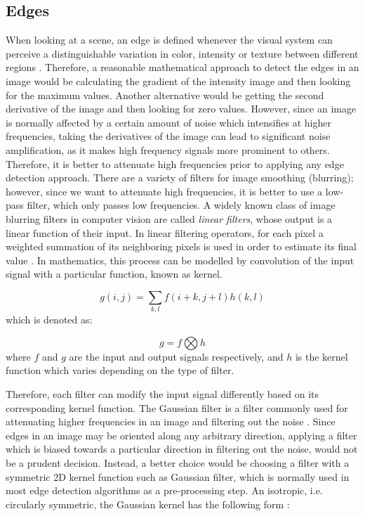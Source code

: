 \subsection{Edges}
When looking at a scene, an edge is defined whenever the visual system can perceive a distinguishable variation in color, intensity or texture between 
different regions \cite{sze11}.
Therefore, a reasonable mathematical approach to detect the edges in an image would be calculating the gradient of the intensity image and then looking for the maximum
values. Another alternative would be getting the second derivative of the image and then looking for zero values. However, since an image is normally affected by a 
certain amount of noise which intensifies at higher frequencies, taking the derivatives of the image can lead to significant noise amplification, 
as it makes high frequency signals more prominent to others.
Therefore, it is better to attenuate high frequencies prior to applying any edge detection approach. 
There are a variety of filters for image smoothing (blurring); however, since we want to attenuate high frequencies, it is better to use a low-pass filter,
which only passes low frequencies.
A widely known class of image blurring filters in computer vision are called {\it linear filters}, whose output is a linear function of their input. 
In linear filtering operators, for each pixel a weighted summation of its neighboring pixels
is used in order to estimate its final value \cite{sze11}. In mathematics, this process can be modelled by convolution of the input signal with a particular function, known as kernel. 

\begin{equation}
g(i,j)=\sum_{k,l}f(i+k,j+l)h(k,l)
\end{equation}
which is denoted as:

\begin{equation}
g=f\bigotimes h
\end{equation}
where $f$ and $g$ are the input and output signals respectively, and $h$ is the kernel function which varies depending on the type of filter. 

Therefore, each filter can modify the input signal differently based on its corresponding kernel function.
The Gaussian filter is a filter commonly used for attenuating higher frequencies in an image and filtering out the noise \cite{wells86}. 
Since edges in an image may be oriented along any arbitrary direction, 
applying a filter which is biased towards a particular direction in filtering out the noise, would not be a prudent decision. Instead, a better choice would be choosing a filter 
with a symmetric 2D kernel function such as Gaussian filter, which is normally used in most edge detection algorithms as a pre-processing step. 
An isotropic, i.e. circularly symmetric, the Gaussian kernel has the following form \cite{sze11}:

